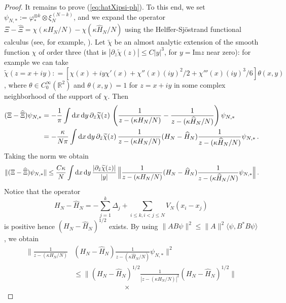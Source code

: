 \documentclass[11pt]{article}
\newcommand{\rd}{{\rm d}}
\newcommand{\ph}{\varphi}
\newcommand{\bR}{{\mathbb R}}
\newcommand{\wt}{\widetilde}
\newcommand{\wh}{\widehat}
\begin{document}
\begin{proof}
It remains to prove (\ref{eq:hatXipsi-ph}). To this end, we set
$\psi_{N,*}:=\ph_*^{\otimes k} \otimes \xi_N^{(N-k)}$, and we expand
the operator $\Xi-\wh\Xi=\chi(\kappa H_N/N) - \chi (\kappa \wh
H_N/N)$ using the Helffer-Sj\"ostrand functional calculus (see, for
example, \cite{Dav}). Let $\wt \chi$ be an almost analytic extension
of the smooth function $\chi$ of order three (that is
$|\partial_{\overline z} \wt \chi (z)| \leq C |y|^3$, for $y
=\text{Im} z$ near zero): for example we can take $\wt\chi (z=x+iy):
= [\chi (x) + i y \chi' (x) + \chi'' (x) (iy)^2 /2 + \chi''' (x)
(iy)^3 /6] \theta (x,y)$, where $\theta \in C_0^{\infty} (\bR^2)$
and $\theta (x,y) = 1$ for $z =x +iy$ in some complex neighborhood
of the support of $\chi$. Then
\begin{equation}
\begin{split}
(\Xi - \wh \Xi) \psi_{N,*} &= -\frac{1}{\pi} \int \rd x \, \rd y \,
\partial_{\bar z} \wt \chi (z) \, \left( \frac{1}{z - (\kappa
H_N/N)} - \frac{1}{z - (\kappa \wh H_N/N)} \right) \psi_{N,*} \\
&= - \frac{\kappa}{N \pi} \int \rd x \, \rd y \,
\partial_{\bar z} \wt \chi (z) \, \frac{1}{z - (\kappa
H_N/N)} (H_N - \wh H_N) \frac{1}{z - (\kappa \wh H_N/N)} \psi_{N,*}
\, .
\end{split}
\end{equation}
Taking the norm we obtain
\begin{equation}\label{eq:Helffer}
\| (\Xi - \wh \Xi) \psi_{N,*} \| \leq \frac{C\kappa}{N} \int \rd x
\, \rd y \, \frac{|\partial_{\bar z } \wt \chi (z)|}{|y|} \, \Big\|
 \frac{1}{z- (\kappa H_N/N)} (H_N - \wh H_N ) \frac{1}{z - (\kappa \wh H_N/N)}\psi_{N,*} \Big\|
\, .
\end{equation}
Notice that the operator
\begin{equation}
\label{eq:diff}
H_N -\wh H_N = -\sum_{j=1}^k \Delta_j + \sum_{i\leq
k, i < j \leq N} V_N (x_i -x_j) \,
\end{equation}
is positive hence $(H_N-\wh H_N)^{1/2}$ exists. By using
$\|AB\psi\|^2 \leq \|A\|^2 \langle\psi, B^*B\psi\rangle$, we obtain
\begin{equation}\label{eq:norm2}
\begin{split}
\Big\| \frac{1}{z- (\kappa H_N/N)} & (H_N - \wh H_N ) \frac{1}{z -
(\kappa \wh H_N/N)}\psi_{N,*}
 \Big\|^2 \\
& \leq \Big\| (H_N - \wh H_N)^{1/2}\frac{1}{|z - (\kappa
H_N/N)|^2} (H_N - \wh H_N)^{1/2} \Big\| \, \\ & \hspace{3cm} \times

\end{split}
\end{equation}
\end{proof}
\end{document}
